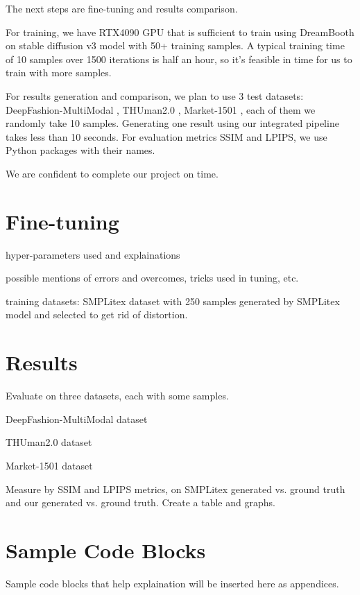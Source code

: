 \documentclass[acmtog]{acmart}
\begin{document}
The next steps are fine-tuning and results comparison.

For training, we have RTX4090 GPU that is sufficient to train using DreamBooth on stable diffusion v3 model with 50+ training samples. A typical training time of 10 samples over 1500 iterations is half an hour, so it's feasible in time for us to train with more samples.

For results generation and comparison, we plan to use 3 test datasets: DeepFashion-MultiModal \cite{jiang2022text2human}, THUman2.0 \cite{yu2021function4d}, Market-1501 \cite{zheng2015scalable}, each of them we randomly take 10 samples. Generating one result using our integrated pipeline takes less than 10 seconds. For evaluation metrics SSIM and LPIPS, we use Python packages with their names.

We are confident to complete our project on time.

\section{Fine-tuning}

hyper-parameters used and explainations

possible mentions of errors and overcomes, tricks used in tuning, etc.

training datasets: SMPLitex dataset with 250 samples generated by SMPLitex model and selected to get rid of distortion.

\section{Results}

Evaluate on three datasets, each with some samples.

DeepFashion-MultiModal dataset \cite{jiang2022text2human}

THUman2.0 dataset \cite{yu2021function4d}

Market-1501 dataset \cite{zheng2015scalable}

Measure by SSIM and LPIPS metrics, on SMPLitex generated vs. ground truth and our generated vs. ground truth. Create a table and graphs.






\appendix

\section{Sample Code Blocks}

Sample code blocks that help explaination will be inserted here as appendices.
\end{document}

